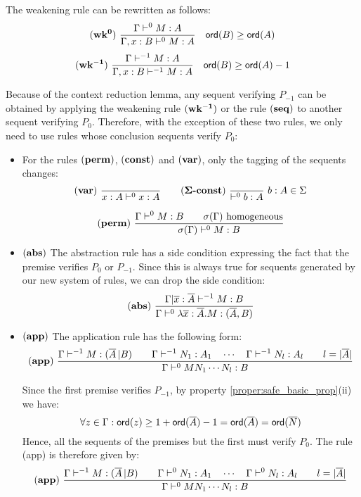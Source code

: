 The weakening rule can be rewritten as follows:
$$ \mathbf{(wk^{0})} \   \frac{\displaystyle \Gamma \vdash^{0} M : A}{\Gamma , x : B \vdash^{0} M : A} \quad {\sf ord}(B) \geq {\sf ord}(A) $$
$$ \mathbf{(wk^{-1})} \   \frac{\displaystyle \Gamma \vdash^{-1} M : A}{\Gamma , x : B \vdash^{-1} M : A} \quad {\sf ord}(B) \geq {\sf ord}(A) -1$$

Because of the context reduction lemma, any sequent verifying $P_{-1}$ can be obtained
by applying the weakening rule $\mathbf{(wk^{-1})}$ or the rule $\mathbf{(seq)}$ to another sequent
verifying $P_0$. Therefore, with the exception of these two rules, we only need to use rules
whose conclusion sequents verify $P_0$:
\begin{itemize}
\item For the rules $\mathbf{(perm)}$, $\mathbf{(const)}$ and $\mathbf{(var)}$, only the tagging of the sequents
changes:
$$ \rulename{var} \   \rulef{}{x : A\vdash^{0} x : A}
\qquad
\rulename{\Sigma\mbox{\textbf{-const}}}  \  \rulef{}{\vdash^0 b : A} \ b:A \in \Sigma
$$

$$
  \mathbf{(perm)} \  \frac{\displaystyle 
      { \Gamma \vdash^0 M:B \qquad \sigma(\Gamma)  } \hbox{ homogeneous}
    }{ \sigma(\Gamma) \vdash^0 M : B }
$$

\item $\mathbf{(abs)}$ The abstraction rule has a side condition
expressing the fact that the premise verifies $P_0$ or $P_{-1}$. Since this is always true for sequents
generated by our new system of rules, we can drop the side condition:
$$ \mathbf{(abs)} \   \frac{\displaystyle \Gamma | \overline{x} : \overline{A} \vdash^{-1} M : B}{\Gamma  \vdash^{0} \lambda \overline{x} : \overline{A} . M : (\overline{A},B)}$$


\item $\mathbf{(app)}$ The application rule has the following form:
$$ \mathbf{(app)} \
    \frac{\displaystyle 
        { \Gamma \vdash^{-1} M : (\overline{A} \, | B)
        \qquad
        \Gamma \vdash^{-1} N_1 : A_1 \quad \cdots \quad \Gamma \vdash^{-1} N_{l} : A_l \qquad l = |\overline{A}|
        }
    }{
        \Gamma \vdash^0 M N_1 \cdots N_{l} : B
    }
$$

Since the first premise verifies $P_{-1}$, by property \ref{proper:safe_basic_prop}(ii) we have:
$$\forall z \in \Gamma : {\sf ord}(z) \geq 1 + {\sf ord}(\overline{A}) -1 = {\sf ord}(\overline{A}) = {\sf ord}(\overline{N})$$
Hence, all the sequents of the premises but the first must verify $P_0$. The rule (app) is therefore given by:
$$ \mathbf{(app)} \
    \frac{\displaystyle 
        { \Gamma \vdash^{-1} M : (\overline{A} \, | B)
        \qquad
        \Gamma \vdash^0 N_1 : A_1 \quad \cdots \quad \Gamma \vdash^0 N_{l} : A_l \qquad l = |\overline{A}|
        }
    }{
        \Gamma \vdash^0 M N_1 \cdots N_{l} : B
      }
$$


\end{itemize}
